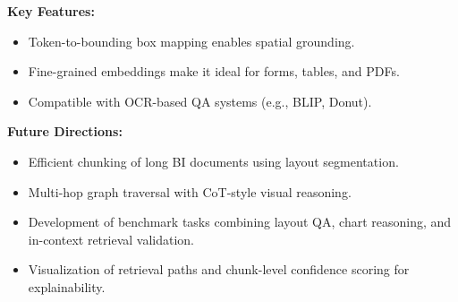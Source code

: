 \documentclass[11pt]{article}
\begin{document}
\textbf{Key Features:}
\begin{itemize}
    \item Token-to-bounding box mapping enables spatial grounding.
    \item Fine-grained embeddings make it ideal for forms, tables, and PDFs.
    \item Compatible with OCR-based QA systems (e.g., BLIP, Donut).
\end{itemize}

\textbf{Future Directions:}
\begin{itemize}
    \item Efficient chunking of long BI documents using layout segmentation.
    \item Multi-hop graph traversal with CoT-style visual reasoning.
    \item Development of benchmark tasks combining layout QA, chart reasoning, and in-context retrieval validation.
    \item Visualization of retrieval paths and chunk-level confidence scoring for explainability.
\end{itemize}



\nocite{masry2023unichart, zhang2024chartassistant, lin2024chartinstruct, li2024visualizationliteracy, bendeck2024gpt4vis, huang2024survey, huang2023layoutlmv3, zhang2024mmgem, liu2023vectordbsurvey}


\end{document}

